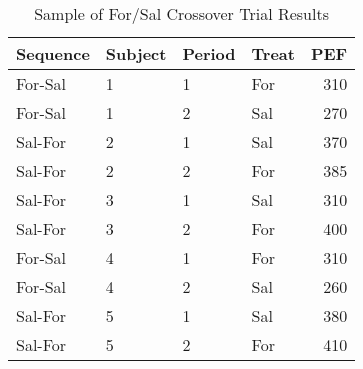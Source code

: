 \begin{table}
\centering
\caption{Sample of For/Sal Crossover Trial Results}
\centering
\begin{tabular}[t]{l|l|l|l|r}
\hline
\textbf{Sequence} & \textbf{Subject} &
\textbf{Period} & \textbf{Treat} & \textbf{PEF}\\
\hline
For-Sal & 1 & 1 & For & 310\\
\hline
For-Sal & 1 & 2 & Sal & 270\\
\hline
Sal-For & 2 & 1 & Sal & 370\\
\hline
Sal-For & 2 & 2 & For & 385\\
\hline
Sal-For & 3 & 1 & Sal & 310\\
\hline
Sal-For & 3 & 2 & For & 400\\
\hline
For-Sal & 4 & 1 & For & 310\\
\hline
For-Sal & 4 & 2 & Sal & 260\\
\hline
Sal-For & 5 & 1 & Sal & 380\\
\hline
Sal-For & 5 & 2 & For & 410\\
\hline
\end{tabular}
\label{crossoverDataLong}
\end{table}

